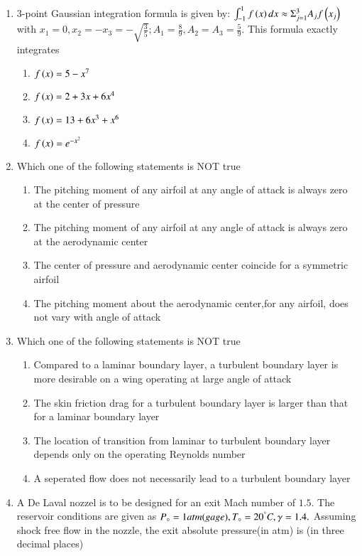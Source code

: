 \documentclass[journal,12pt,onecolumn]{IEEEtran}
\theoremstyle{remark}
\begin{document}
\begin{enumerate}[start=1]
\item $3$-point Gaussian integration formula is given by:
	$\int_{-1}^{1}f\left(x\right)dx \approx \Sigma_{j=1}^{3} A_jf\left(x_j\right)$ with $x_1=0,x_2=-x_3=-\sqrt{\frac{3}{5}};A_1=\frac{8}{9},A_2=A_3=\frac{5}{9}.$
		This formula exactly integrates
		\begin{enumerate}
			\item $f\left(x\right)=5-x^7$
			\item $f\left(x\right)=2+3x+6x^4$
			\item $f\left(x\right)=13+6x^3+x^6$
			\item $f\left(x\right)=e^{-x^2}$
		\end{enumerate}

\item Which one of the following statements is NOT true
	\begin{enumerate}
        \item The pitching moment of any airfoil at any angle of attack is always zero at the center of pressure
        \item The pitching moment of any airfoil at any angle of attack is always zero at the aerodynamic center
        \item The center of pressure and aerodynamic center coincide for a symmetric airfoil
        \item The pitching moment about the aerodynamic center,for any airfoil, does not vary with angle of attack
	\end{enumerate}

\item Which one of the following statements is NOT true
	\begin{enumerate}
		\item Compared to a laminar boundary layer, a turbulent boundary layer is more desirable on a wing operating at large angle of attack
		\item The skin friction drag for a turbulent boundary layer is larger than that for a laminar boundary layer
		\item The location of transition from laminar to turbulent boundary layer depends only on the operating Reynolds number
		\item A seperated flow does not necessarily lead to a turbulent boundary layer
	\end{enumerate}
\item A De Laval nozzel is to be designed for an exit Mach number of $1.5$. The reservoir conditions are given as $P_{\circ}=1 atm(gage),T_{\circ}=20^{\degree}C,\gamma=1.4.$ Assuming shock free flow in the nozzle, the exit absolute pressure(in atm) is \underline{\hspace{2cm}} (in three decimal places)


\end{enumerate}
\end{document}
